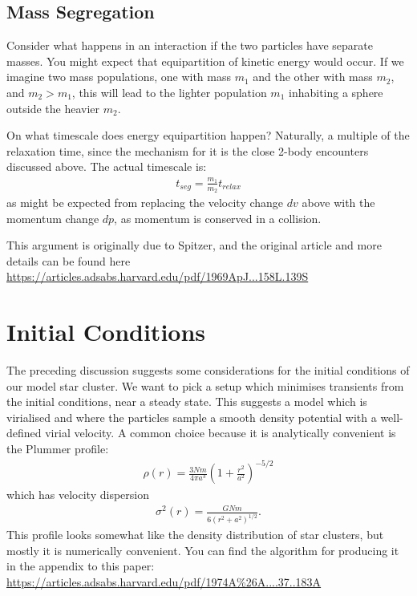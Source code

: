 \documentclass[12pt]{article}
\begin{document}
\subsection{Mass Segregation}

Consider what happens in an interaction if the two particles have separate masses. You might expect that equipartition of kinetic energy would occur. If we imagine two mass populations, one with mass $m_1$ and the other with mass $m_2$, and $m_2 > m_1$, this will lead to the lighter population $m_1$ inhabiting a sphere outside the heavier $m_2$.

On what timescale does energy equipartition happen? Naturally, a multiple of the relaxation time, since the mechanism for it is the close 2-body encounters discussed above. The actual timescale is:
\begin{align}
 t_{seg} = \frac{m_1}{m_2} t_{relax}
\end{align}
as might be expected from replacing the velocity change $dv$ above with the momentum change $dp$, as momentum is conserved in a collision.

This argument is originally due to Spitzer, and the original article and more details can be found here \url{https://articles.adsabs.harvard.edu/pdf/1969ApJ...158L.139S}

\section{Initial Conditions}

The preceding discussion suggests some considerations for the initial conditions of our model star cluster. We want to pick a setup which minimises transients from the initial conditions, near a steady state. This suggests a model which is virialised and where the particles sample a smooth density potential with a well-defined virial velocity. A common choice because it is analytically convenient is the Plummer profile:
\begin{align}
 \rho (r) = \frac{3 N m}{4 \pi a^3} \left(1 + \frac{r^2}{a^2} \right)^{-5/2}
\end{align}
which has velocity dispersion
\begin{align}
 \sigma^2(r) = \frac{G N m}{6 (r^2 + a^2)^{1/2}}.
\end{align}
This profile looks somewhat like the density distribution of star clusters, but mostly it is numerically convenient. You can find the algorithm for producing it in the appendix to this paper: \url{https://articles.adsabs.harvard.edu/pdf/1974A\%26A....37..183A}
\end{document}
